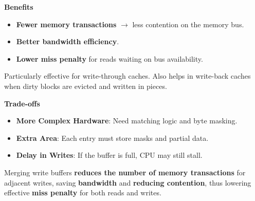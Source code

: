 \highspace
\begin{flushleft}
    \textcolor{Green3}{ \textbf{Benefits}}
\end{flushleft}
\begin{itemize}
    \item[\textcolor{Green3}{\faIcon{check}}] \textbf{Fewer memory transactions} $\rightarrow$ less contention on the memory bus.
    \item[\textcolor{Green3}{\faIcon{check}}] \textbf{Better bandwidth efficiency}.
    \item[\textcolor{Green3}{\faIcon{check}}] \textbf{Lower miss penalty} for reads waiting on bus availability.
\end{itemize}
Particularly effective for write-through caches. Also helps in write-back caches when dirty blocks are evicted and written in pieces.

\highspace
\begin{flushleft}
    \textcolor{Red2}{ \textbf{Trade-offs}}
\end{flushleft}
\begin{itemize}
    \item[\textcolor{Red2}{\faIcon{times}}] \textbf{More Complex Hardware}: Need matching logic and byte masking.
    \item[\textcolor{Red2}{\faIcon{times}}] \textbf{Extra Area}: Each entry must store masks and partial data.
    \item[\textcolor{Red2}{\faIcon{times}}] \textbf{Delay in Writes}: If the buffer is full, CPU may still stall.
\end{itemize}

\highspace
Merging write buffers \textbf{reduces the number of memory transactions} for adjacent writes, saving \textbf{bandwidth} and \textbf{reducing contention}, thus lowering effective \textbf{miss penalty} for both reads and writes.